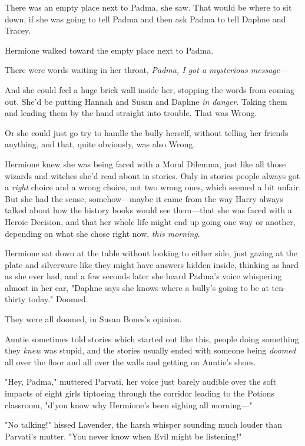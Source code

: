 There was an empty place next to Padma, she saw. That would be where to sit
down, if she was going to tell Padma and then ask Padma to tell Daphne and
Tracey.

Hermione walked toward the empty place next to Padma.

There were words waiting in her throat, \emph{Padma, I got a
mysterious message---}

And she could feel a huge brick wall inside her, stopping the words from coming
out. She'd be putting Hannah and Susan and Daphne \emph{in danger}. Taking them
and leading them by the hand straight into trouble. That was Wrong.

Or she could just go try to handle the bully herself, without telling her
friends anything, and that, quite obviously, was also Wrong.

Hermione knew she was being faced with a Moral Dilemma, just like all those
wizards and witches she'd read about in stories. Only in stories people always
got a \emph{right} choice and a wrong choice, not two wrong ones, which seemed
a bit unfair. But she had the sense, somehow---maybe it came from the way Harry
always talked about how the history books would see them---that she was faced
with a Heroic Decision, and that her whole life might end up going one way or
another, depending on what she chose right now, \emph{this morning}.

Hermione sat down at the table without looking to either side, just gazing at
the plate and silverware like they might have answers hidden inside, thinking
as hard as she ever had, and a few seconds later she heard Padma's voice
whispering almost in her ear, "Daphne says she knows where a bully's going to
be at ten-thirty today."
\sbreak
Doomed.

They were all doomed, in Susan Bones's opinion.

Auntie sometimes told stories which started out like this, people doing
something they \emph{knew} was stupid, and the stories usually ended with
someone being \emph{doomed} all over the floor and all over the walls and
getting on Auntie's shoes.

"Hey, Padma," muttered Parvati, her voice just barely audible over the soft
impacts of eight girls tiptoeing through the corridor leading to the Potions
classroom, "d'you know why Hermione's been sighing all morning\mbox{---}"

"No talking!" hissed Lavender, the harsh whisper sounding much louder than
Parvati's mutter. "You never know when Evil might be listening!"

